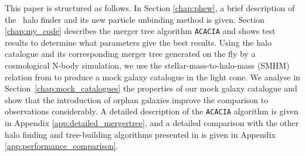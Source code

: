 This paper is structured as follows.  In Section \ref{chap:phew}, a
brief description of the \phew\ halo finder and its new particle
unbinding method is given.  Section \ref{chap:my_code} describes the
merger tree algorithm \texttt{ACACIA} and shows test results to
determine what parameters give the best results.  Using the halo
catalogue and its corresponding merger tree generated on the fly by a
cosmological N-body simulation, we use the stellar-mass-to-halo-mass
(SMHM) relation from \cite{Behroozi} to produce a mock galaxy
catalogue in the light cone. We analyse in
Section~\ref{chap:mock_catalogues} the properties of our mock galaxy
catalogue and show that the introduction of orphan galaxies improve
the comparison to observations considerably. A detailed description of
the \texttt{ACACIA} algorithm is given in Appendix
\ref{app:detailed_mergertree}, and a detailed comparison with the
other halo finding and tree-building algorithms presented in
\citet{SUSSING_HALOFINDER} is given in Appendix
\ref{app:performance_comparison}.
